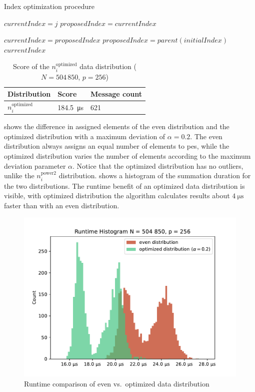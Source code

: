 \begin{algorithm}
\caption{Index optimization procedure}\label{algo:optimizeIndex}
\DontPrintSemicolon
\SetAlgoLined
{}

$currentIndex = j$\;
$proposedIndex = currentIndex$\;

 {
	$currentIndex = proposedIndex$\;
	$proposedIndex = parent(initialIndex)$\;
}
\Return $currentIndex$\;
\end{algorithm}


\begin{table}
\centering
\caption{Score of the $n_i^\textrm{optimized}$ data distribution ($N = 504\,850$, $p=256$)}
\label{table:OptimizedDistributionScore}
\begin{tabular}{l|l|l}
Distribution & Score & Message count \\
\hline
$n_i^\textrm{optimized}$ & \SI{184.5}{\micro\second} & 621
\end{tabular}
\end{table}

 shows the difference in assigned elements of the even distribution and the optimized distribution with a maximum deviation of $\alpha = 0.2$.
The even distribution always assigns an equal number of elements to \glspl{pe}, while the optimized distribution varies the number of elements according to the maximum deviation parameter $\alpha$.
Notice that the optimized distribution has no outliers, unlike the $n_i^\textrm{power2}$ distribution.
 shows a histogram of the summation duration for the two distributions.
The runtime benefit of an optimized data distribution is visible, with optimized distribution the algorithm calculates results about $\SI{4}{\micro\second}$ faster than with  an even distribution.

\begin{figure}
\centering
\includegraphics[scale=0.75]{figures/distribution_experiment}
\caption{Runtime comparison of even vs.\ optimized data distribution}
\label{fig:distribution_runtimes}
\end{figure}

